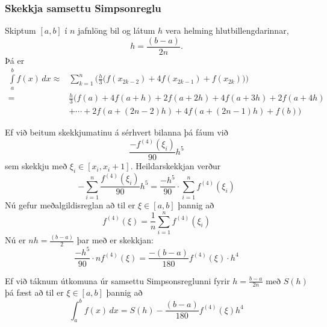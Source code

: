 \documentclass[icelandic,a4paper,12pt]{article}
\begin{document}
\subsubsection{Skekkja samsettu Simpsonreglu}
Skiptum $[a,b]$ í $n$ jafnlöng bil og látum $h$ vera helming
hlutbillengdarinnar,
\begin{equation*}
  h = \frac{(b-a)}{2n}.
\end{equation*}
\pause
Þá er
{\small
\begin{align*}
  \int\limits_a^b f(x) \, dx
  \approx &
  \sum\limits_{k=1}^n
  \bigg(
    \frac{h}{3}
    \Big(
      f(x_{2k-2}) + 4f(x_{2k-1}) + f(x_{2k})
    \Big)
  \bigg) \\
  = &
  \frac{h}{3}
  \Big( 
    f(a) + 4f(a+h) + 2f(a+2h)+ 4f(a+3h) + 2f(a+4h) \\
    &+ \cdots + 2f(a+(2n-2)h) + 4f(a+(2n-1)h) + f(b)
  \Big)
\end{align*}}



Ef við beitum skekkjumatinu á sérhvert bilanna þá fáum við 
\begin{equation*}
  \frac{-f^{(4)}(\xi_i)}{90}h^5
\end{equation*}
sem skekkju með $\xi_i \in [x_i, x_i+1]$. Heildarskekkjan verður
\begin{equation*}
  -\sum_{i=1}^n \frac{f^{(4)}(\xi_i)}{90}h^5 
  = \frac{-h^5}{90}\cdot \sum_{i=1}^n f^{(4)}(\xi_i)
\end{equation*}
\pause
Nú gefur meðalgildisreglan að til er $\xi \in [a,b]$ þannig að
\begin{equation*}
  f^{(4)}(\xi) = \frac{1}{n} \sum_{i=1}^n f^{(4)}(\xi_i)
\end{equation*}
\pause
Nú er $nh = \frac{(b-a)}{2}$ þar með er skekkjan:
\begin{equation*}
  \frac{-h^5}{90}\cdot nf^{(4)}(\xi) 
  = \frac{-(b-a)}{180}f^{(4)}(\xi)\cdot h^4
\end{equation*}


\pause
Ef við táknum útkomuna úr samsettu Simpsonsreglunni fyrir 
$h=\frac{b-a}{2n}$ með $S(h)$ þá fæst að til er
$\xi \in [a,b]$ þannig að
\begin{equation*}
  \int_a^b f(x)\,dx = S(h) - \frac{(b-a)}{180}f^{(4)}(\xi)h^4
\end{equation*}
\end{document}
